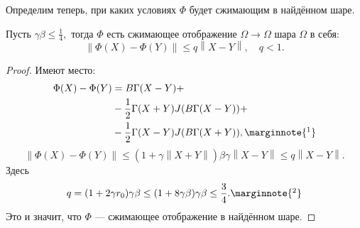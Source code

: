 Определим теперь, при каких условиях \( \Phi \) будет сжимающим в найдённом шаре.
\begin{lemma}
    Пусть \( \gamma\beta \leq \frac14, \)
    тогда \( \Phi \) есть сжимающее отображение \(\Omega\to\Omega\) шара \(\Omega\) в себя:
    \[ {\left\|\Phi(X)-\Phi(Y)\right\|} \leq q {\left\|X-Y\right\|}, \quad q<1.\]
\end{lemma}
\begin{proof}
    Имеют место:
    \begin{align*}
        \Phi(X) - \Phi(Y) &= B\Gamma (X-Y) + \\
        &- \frac12 \Gamma (X + Y)J(B\Gamma(X - Y)) + \\
        &- \frac12 \Gamma (X - Y)J(B\Gamma(X + Y)),
        \marginnote{\footnotemark}
    \end{align*}
    \[
        {\left\|\Phi(X) - \Phi(Y)\right\|} \leq (1 + \gamma{\left\|X+Y\right\|})\beta\gamma {\left\|X-Y\right\|} \leq q{\left\|X-Y\right\|}.
        \]
    Здесь
    \begin{equation*}\label{eq:lipconst}
        q = (1+2\gamma r_0)\gamma\beta
        \leq (1+8\gamma\beta)\gamma\beta \leq \frac{3}{4}.
        \marginnote{\footnotemark}
    \end{equation*}
    Это и значит, что \( \Phi \) --- сжимающее отображение в найдённом шаре.
\end{proof}

